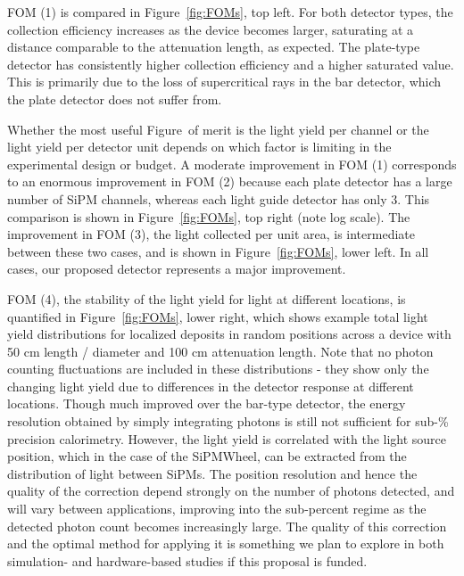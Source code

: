 FOM (1) is compared in Figure~\ref{fig:FOMs}, top left.   For both detector types, the collection efficiency increases as the device becomes larger, saturating at a distance comparable to the attenuation length, as expected.   The plate-type detector has consistently higher collection efficiency and a higher saturated value.  This is primarily due to the loss of supercritical rays in the bar detector, which the plate detector does not suffer from.

Whether the most useful Figure~of merit is the light yield per channel or the light yield per detector unit depends on which factor is limiting in the experimental design or budget.  A moderate improvement in FOM (1) corresponds to an enormous improvement in FOM (2) because each plate detector has a large number of SiPM channels, whereas each light guide detector has only 3. This comparison is shown in Figure~\ref{fig:FOMs}, top right (note log scale).  The improvement in FOM (3), the light collected per unit area, is intermediate between these two cases, and is shown in Figure~\ref{fig:FOMs}, lower left.  In all cases, our proposed detector represents a major improvement.

FOM (4), the stability of the light yield for light at different locations, is quantified in Figure~\ref{fig:FOMs}, lower right, which shows example total light yield distributions for localized deposits in random positions across a device with 50 cm length / diameter and 100 cm attenuation length.   Note that no photon counting fluctuations are included in these distributions - they show only the changing light yield due to differences in the detector response at different locations.  Though much improved over the bar-type detector, the energy resolution obtained by simply integrating photons is still not sufficient for sub-\% precision calorimetry.  However, the light yield is correlated with the light source position, which in the case of the SiPMWheel, can be extracted from the distribution of light between SiPMs.  The position resolution and hence the quality of the correction depend strongly on the number of photons detected, and will vary between applications, improving into the sub-percent regime as the detected photon count becomes increasingly large.  The quality of this correction and the optimal method for applying it is something we plan to explore in both simulation- and hardware-based studies if this proposal is funded.




